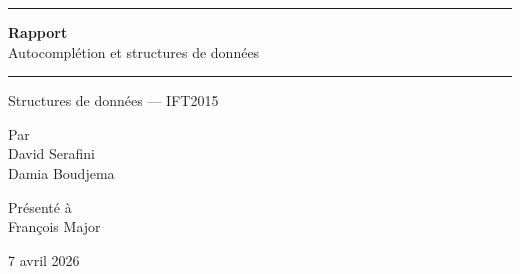 \documentclass[12pt,a4paper]{article}
\begin{document}

\begin{titlepage}
  \centering

  \textcolor{udemblue}{\rule{\linewidth}{2.5pt}}
  \vspace{8pt}

  {\Huge\bfseries Rapport}\\[6pt]
  {\Large Autocomplétion et structures de données}

  \vspace{6pt}
  \textcolor{udemblue}{\rule{\linewidth}{2.5pt}}

  \vspace{18mm}
  {\Large Structures de données — IFT2015}

  \vspace{28mm}
  {\large Par\\[6pt]
  David Serafini\\
  Damia Boudjema}

  \vspace{22mm}
  {\large Présenté à\\[6pt]
  François Major}

  \vspace{22mm}
  {\large 7 avril 2026}

  \vspace*{\fill}


\end{titlepage}
\end{document}
